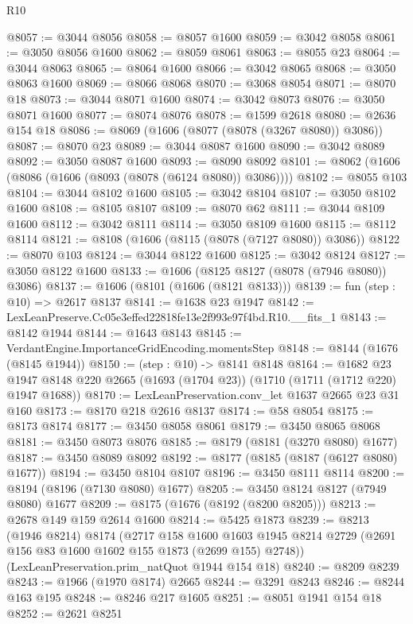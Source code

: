 \begin{lexlean}{R10}
\begin{coremodule}
@8057 := @3044 @8056
@8058 := @8057 @1600
@8059 := @3042 @8058
@8061 := @3050 @8056 @1600
@8062 := @8059 @8061
@8063 := @8055 @23
@8064 := @3044 @8063
@8065 := @8064 @1600
@8066 := @3042 @8065
@8068 := @3050 @8063 @1600
@8069 := @8066 @8068
@8070 := @3068 @8054
@8071 := @8070 @18
@8073 := @3044 @8071 @1600
@8074 := @3042 @8073
@8076 := @3050 @8071 @1600
@8077 := @8074 @8076
@8078 := @1599 @2618
@8080 := @2636 @154 @18
@8086 := @8069 (@1606 (@8077 (@8078 (@3267 @8080)) @3086))
@8087 := @8070 @23
@8089 := @3044 @8087 @1600
@8090 := @3042 @8089
@8092 := @3050 @8087 @1600
@8093 := @8090 @8092
@8101 := @8062 (@1606 (@8086 (@1606 (@8093 (@8078 (@6124 @8080)) @3086))))
@8102 := @8055 @103
@8104 := @3044 @8102 @1600
@8105 := @3042 @8104
@8107 := @3050 @8102 @1600
@8108 := @8105 @8107
@8109 := @8070 @62
@8111 := @3044 @8109 @1600
@8112 := @3042 @8111
@8114 := @3050 @8109 @1600
@8115 := @8112 @8114
@8121 := @8108 (@1606 (@8115 (@8078 (@7127 @8080)) @3086))
@8122 := @8070 @103
@8124 := @3044 @8122 @1600
@8125 := @3042 @8124
@8127 := @3050 @8122 @1600
@8133 := @1606 (@8125 @8127 (@8078 (@7946 @8080)) @3086)
@8137 := @1606 (@8101 (@1606 (@8121 @8133)))
@8139 := fun (step : @10) => @2617 @8137
@8141 := @1638 @23 @1947
@8142 := LexLeanPreserve.Cc05e3effed22818fe13e2f993e97f4bd.R10.__fits_1
@8143 := @8142 @1944
@8144 := @1643 @8143
@8145 := VerdantEngine.ImportanceGridEncoding.momentsStep
@8148 := @8144 (@1676 (@8145 @1944))
@8150 := (step : @10) -> @8141 @8148
@8164 := @1682
    @23
    @1947
    @8148
    @220
    @2665
    (@1693 (@1704 @23))
    (@1710 (@1711 (@1712 @220) @1947 @1688))
@8170 := LexLeanPreservation.conv_let @1637 @2665 @23 @31 @160
@8173 := @8170 @218 @2616 @8137
@8174 := @58 @8054
@8175 := @8173 @8174
@8177 := @3450 @8058 @8061
@8179 := @3450 @8065 @8068
@8181 := @3450 @8073 @8076
@8185 := @8179 (@8181 (@3270 @8080) @1677)
@8187 := @3450 @8089 @8092
@8192 := @8177 (@8185 (@8187 (@6127 @8080) @1677))
@8194 := @3450 @8104 @8107
@8196 := @3450 @8111 @8114
@8200 := @8194 (@8196 (@7130 @8080) @1677)
@8205 := @3450 @8124 @8127 (@7949 @8080) @1677
@8209 := @8175 (@1676 (@8192 (@8200 @8205)))
@8213 := @2678 @149 @159 @2614 @1600
@8214 := @5425 @1873
@8239 := @8213
    (@1946 @8214)
    @8174
    (@2717
      @158
      @1600
      @1603
      @1945
      @8214
      @2729
      (@2691 @156 @83 @1600 @1602 @155 @1873 (@2699 @155) @2748))
    (LexLeanPreservation.prim_natQuot @1944 @154 @18)
@8240 := @8209 @8239
@8243 := @1966 (@1970 @8174) @2665
@8244 := @3291 @8243
@8246 := @8244 @163 @195
@8248 := @8246 @217 @1605
@8251 := @8051 @1941 @154 @18
@8252 := @2621 @8251

\end{coremodule}
\end{lexlean}
